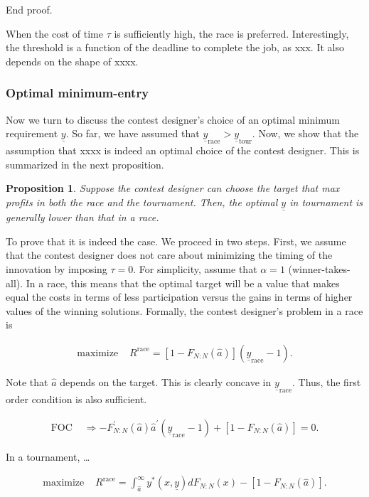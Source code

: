 \documentclass[12pt,]{article}
\theoremstyle{plain} %
\newtheorem{proposition}{Proposition}
\newcommand\target{\underline{y}}
\newcommand\race{\text{race}}
\newcommand\tournament{\text{tour}}
\newcommand\mtype{\hat{a}}
\begin{document}
End proof.

When the cost of time \(\tau\) is sufficiently high, the race is
preferred. Interestingly, the threshold is a function of the deadline to
complete the job, as xxx. It also depends on the shape of xxxx.

\subsubsection{Optimal minimum-entry}\label{optimal-minimum-entry}

Now we turn to discuss the contest designer's choice of an optimal
minimum requirement \(\target\). So far, we have assumed that
\(\target_\race>\target_\tournament\). Now, we show that the assumption
that xxxx is indeed an optimal choice of the contest designer. This is
summarized in the next proposition.

\begin{proposition}
Suppose the contest designer can choose the target that max profits in both the race and the tournament. Then, the optimal $\target$ in tournament is generally lower than that in a race.
\end{proposition}

To prove that it is indeed the case. We proceed in two steps. First, we
assume that the contest designer does not care about minimizing the
timing of the innovation by imposing \(\tau = 0\). For simplicity,
assume that \(\alpha=1\) (winner-takes-all). In a race, this means that
the optimal target will be a value that makes equal the costs in terms
of less participation versus the gains in terms of higher values of the
winning solutions. Formally, the contest designer's problem in a race is

\begin{align}
  \text{maximize } & R^\race = [1-F_{N:N}(\mtype)] (\target_\race - 1).
\end{align}

Note that \(\mtype\) depends on the target. This is clearly concave in
\(\target_\race\). Thus, the first order condition is also sufficient.

\begin{align}\label{foc race}
  \text{FOC } & \Rightarrow -F^\prime_{N:N}(\mtype) \mtype^\prime (\target_\race - 1) + [1-F_{N:N}(\mtype)] = 0.
\end{align}

In a tournament, \ldots{}

\begin{align}
  \text{maximize } & R^\race = \int_{\mtype}^\infty y^*(x, \target) d F_{N:N}(x) - [1-F_{N:N}(\mtype)]. 
\end{align}
\end{document}
